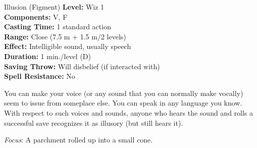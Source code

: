 {Illusion (Figment)}
{
	\textbf{Level:}
	Wiz 1\\
	\textbf{Components:}
	V, F\\
	\textbf{Casting Time:}
	1 standard action\\
	\textbf{Range:}
	Close (7.5 m + 1.5 m/2 levels)\\
	\textbf{Effect:}
	Intelligible sound, usually speech\\
	\textbf{Duration:}
	1 min./level (D)\\
	\textbf{Saving Throw:}
	Will disbelief (if interacted with)\\
	\textbf{Spell Resistance:}
	No\\
}
{
	You can make your voice (or any sound that you can normally make vocally) seem to issue from someplace else. You can speak in any language you know. With respect to such voices and sounds, anyone who hears the sound and rolls a successful save recognizes it as illusory (but still hears it).

	\textit{Focus}:
	A parchment rolled up into a small cone.

}
